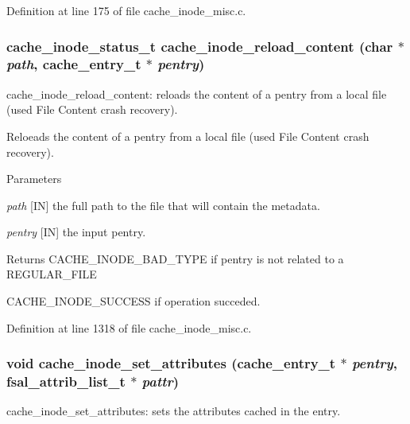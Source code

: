 Definition at line 175 of file cache\_\-inode\_\-misc.c.
\subsubsection[{cache\_\-inode\_\-reload\_\-content}]{\setlength{\rightskip}{0pt plus 5cm}cache\_\-inode\_\-status\_\-t cache\_\-inode\_\-reload\_\-content (char $\ast$ {\em path}, \/  cache\_\-entry\_\-t $\ast$ {\em pentry})}\label{cache__inode__misc_8c_ae0a8ae792a80e2143f3ae5cc1bffe95d}
cache\_\-inode\_\-reload\_\-content: reloads the content of a pentry from a local file (used File Content crash recovery).

Reloeads the content of a pentry from a local file (used File Content crash recovery).


\begin{DoxyParams}{Parameters}
\item[{\em path}][IN] the full path to the file that will contain the metadata. \item[{\em pentry}][IN] the input pentry.\end{DoxyParams}
\begin{DoxyReturn}{Returns}
CACHE\_\-INODE\_\-BAD\_\-TYPE if pentry is not related to a REGULAR\_\-FILE \par
 

CACHE\_\-INODE\_\-SUCCESS if operation succeded. 
\end{DoxyReturn}


Definition at line 1318 of file cache\_\-inode\_\-misc.c.
\subsubsection[{cache\_\-inode\_\-set\_\-attributes}]{\setlength{\rightskip}{0pt plus 5cm}void cache\_\-inode\_\-set\_\-attributes (cache\_\-entry\_\-t $\ast$ {\em pentry}, \/  fsal\_\-attrib\_\-list\_\-t $\ast$ {\em pattr})}\label{cache__inode__misc_8c_a7da7b52764bdb6c1a6d60a2a979322aa}
cache\_\-inode\_\-set\_\-attributes: sets the attributes cached in the entry.

